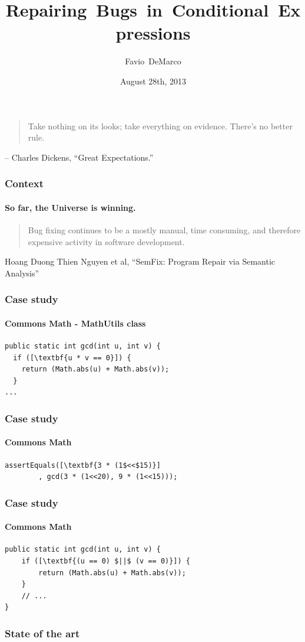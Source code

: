 \documentclass{beamer}
\title[{Repairing Bugs in Conditional Expressions}]{Repairing~Bugs~in~Conditional~Expressions}
\author[Favio DeMarco]{Favio~DeMarco}
\institute[U.B.A. - INRIA]{Universidad de Buenos Aires - INRIA}
\date[08/28/2013]{August 28th, 2013}
\begin{document}
  \frame
  {
\begin{quote}
    Take nothing on its looks; take everything on evidence. There's no better rule.
\end{quote}    
– Charles Dickens, ``Great Expectations.''
  }

\frame
  {
    \titlepage
  }

  \frame
  {
    \frametitle{Context}
    \framesubtitle{So far, the Universe is winning.}
    \begin{quote}
    Bug fixing continues to be a mostly manual, time consuming, and therefore expensive activity in software development.
    \end{quote}
    Hoang Duong Thien Nguyen et al, ``SemFix: Program Repair via Semantic Analysis''
}

 \begin{frame}[fragile]
    \frametitle{Case study}
      \framesubtitle{Commons Math - MathUtils class}
\begin{lstlisting}[escapeinside=\[\]]
public static int gcd(int u, int v) {
  if ([\textbf{u * v == 0}]) {
    return (Math.abs(u) + Math.abs(v));
  }
...
\end{lstlisting}
\end{frame}

 \begin{frame}[fragile]
    \frametitle{Case study}
      \framesubtitle{Commons Math}
        \begin{lstlisting}[escapeinside=\[\]]
assertEquals([\textbf{3 * (1$<<$15)}]
        , gcd(3 * (1<<20), 9 * (1<<15)));
	\end{lstlisting}
\end{frame}

 \begin{frame}[fragile]
    \frametitle{Case study}
      \framesubtitle{Commons Math}
        \begin{lstlisting}[escapeinside=\[\]]
public static int gcd(int u, int v) {
    if ([\textbf{(u == 0) $||$ (v == 0)}]) {
        return (Math.abs(u) + Math.abs(v));
    }
    // ...
}
	\end{lstlisting}
\end{frame}

{
%
  \frame
  {
    \frametitle{State of the art}
  }
}
\end{document}
